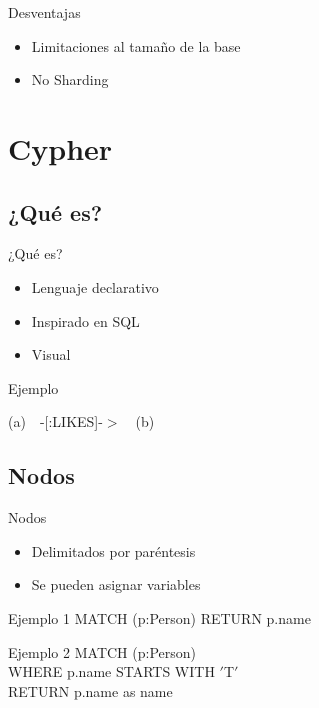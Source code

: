 \documentclass{beamer}
\begin{document}
\begin{frame}{Desventajas}
	\begin{itemize}
		\item Limitaciones al tamaño de la base
		      \pause
		\item No Sharding
	\end{itemize}
\end{frame}

\section{Cypher}

\subsection{¿Qué es?}

\begin{frame}{¿Qué es?}
	\begin{itemize}
		\item Lenguaje declarativo
		      \pause
		\item Inspirado en SQL
		      \pause
		\item Visual
		      \pause
	\end{itemize}

	\begin{block}{Ejemplo}
		\begin{center}

			\vspace{5mm}
			(a)~~-[:LIKES]-$>$~~(b)
		\end{center}

	\end{block}
\end{frame}

\subsection{Nodos}

\begin{frame}{Nodos}
	\begin{itemize}
		\item Delimitados por paréntesis
		      \pause
		\item Se pueden asignar variables
		      \pause
	\end{itemize}


	\begin{block}{Ejemplo 1}
		MATCH (p:Person) RETURN p.name
	\end{block}
	\pause
	\begin{block}{Ejemplo 2}
		MATCH (p:Person)\\
		WHERE p.name STARTS WITH $'$T$'$\\
		RETURN p.name as name
	\end{block}
\end{frame}
\end{document}
